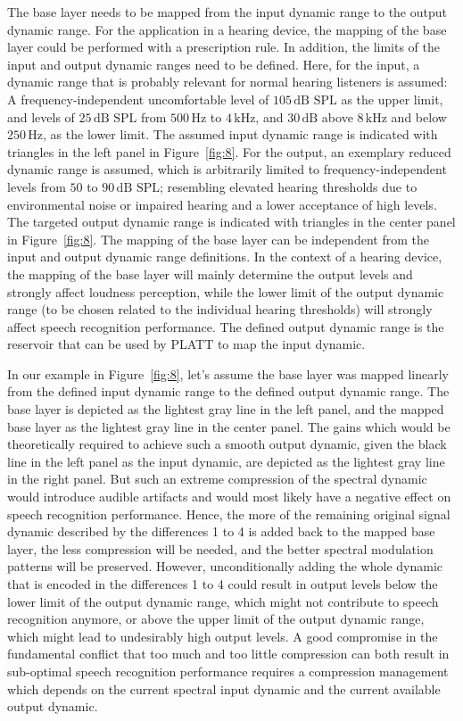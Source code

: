 \documentclass[10pt,a4paper,twocolumn]{article}
\begin{document}
The base layer needs to be mapped from the input dynamic range to the output dynamic range.
%
For the application in a hearing device, the mapping of the base layer could be performed with a prescription rule.
%
In addition, the limits of the input and output dynamic ranges need to be defined.
%
Here, for the input, a dynamic range that is probably relevant for normal hearing listeners is assumed: A frequency-independent uncomfortable level of $105\,\text{dB~SPL}$ as the upper limit, and levels of $25\,\text{dB~SPL}$ from $500\,\text{Hz}$ to $4\,\text{kHz}$, and $30\,\text{dB}$ above $8\,\text{kHz}$ and below $250\,\text{Hz}$, as the lower limit.
%
The assumed input dynamic range is indicated with triangles in the left panel in Figure~\ref{fig:8}.
%
For the output, an exemplary reduced dynamic range is assumed, which is arbitrarily limited to frequency-independent levels from $50$ to $90\,\text{dB~SPL}$; resembling elevated hearing thresholds due to environmental noise or impaired hearing and a lower acceptance of high levels.
%
The targeted output dynamic range is indicated with triangles in the center panel in Figure~\ref{fig:8}.
%
The mapping of the base layer can be independent from the input and output dynamic range definitions.
%
In the context of a hearing device, the mapping of the base layer will mainly determine the output levels and strongly affect loudness perception, while the lower limit of the output dynamic range (to be chosen related to the individual hearing thresholds) will strongly affect speech recognition performance.
%
The defined output dynamic range is the reservoir that can be used by PLATT to map the input dynamic.

In our example in Figure~\ref{fig:8}, let's assume the base layer was mapped linearly from the defined input dynamic range to the defined output dynamic range.
%
The base layer is depicted as the lightest gray line in the left panel, and the mapped base layer as the lightest gray line in the center panel.
%
The gains which would be theoretically required to achieve such a smooth output dynamic, given the black line in the left panel as the input dynamic, are depicted as the lightest gray line in the right panel.
%
But such an extreme compression of the spectral dynamic would introduce audible artifacts and would most likely have a negative effect on speech recognition performance.
%
Hence, the more of the remaining original signal dynamic described by the differences 1 to 4 is added back to the mapped base layer, the less compression will be needed, and the better spectral modulation patterns will be preserved.
%
However, unconditionally adding the whole dynamic that is encoded in the differences 1 to 4 could result in output levels below the lower limit of the output dynamic range, which might not contribute to speech recognition anymore, or above the upper limit of the output dynamic range, which might lead to undesirably high output levels.
%
A good compromise in the fundamental conflict that too much and too little compression can both result in sub-optimal speech recognition performance requires a compression management which depends on the current spectral input dynamic and the current available output dynamic.
\end{document}

